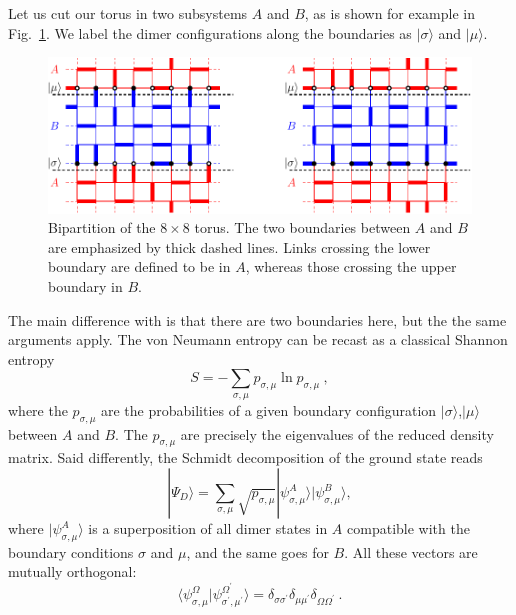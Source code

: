 \documentclass[11pt]{iopart}
\newcommand{\psm}{p_{\sigma,\mu}}
\begin{document}
Let us cut our torus in two subsystems $A$ and $B$, as is shown for example in Fig.~\ref{fig:bipartition}. We label the dimer configurations along the boundaries as $|\sigma\rangle$ and $|\mu\rangle$.
\begin{figure}[ht]
\begin{center}
\includegraphics[scale=0.8]{./figures/bipartition.pdf}
\end{center}
\caption{Bipartition of the $8\times 8$ torus. The two boundaries between $A$ and $B$ are emphasized by thick dashed lines. Links crossing the lower boundary are defined to be in $A$, whereas those crossing the upper boundary in $B$.}
\label{fig:bipartition}
\end{figure}
The main difference with \cite{Shannonee} is that there are two boundaries here, but the the same arguments apply. The von Neumann entropy can be recast as a classical Shannon entropy
\begin{equation}
 S=-\sum_{\sigma,\mu} p_{\sigma,\mu} \ln p_{\sigma,\mu}\ ,
\end{equation}
where the $p_{\sigma,\mu}$ are the probabilities of a given boundary configuration $|\sigma\rangle$,$|\mu\rangle$ between $A$ and $B$. 
\label{sec:lg.}
The $\psm$ are precisely the eigenvalues of the reduced density matrix. Said differently, the Schmidt decomposition of the ground state reads
\begin{equation}\label{eq:schmidt}
|\Psi_D\rangle=\sum_{
\sigma,\mu} \sqrt{p_{\sigma,\mu}}|\psi_{\sigma,\mu}^A\rangle |\psi_{\sigma,\mu}^B\rangle,
\end{equation}
where $|\psi_{\sigma,\mu}^A\rangle$ is a superposition of all dimer states in $A$ compatible with the boundary conditions $\sigma$ and $\mu$, and the same goes for $B$. All these vectors are mutually orthogonal:
\begin{equation}\label{eq:schmidt_orthogonality}
\langle \psi_{\sigma,\mu}^\Omega|\psi_{\sigma^\prime,\mu^\prime}^{\Omega^\prime}\rangle=\delta_{\sigma \sigma^\prime}\delta_{\mu \mu^\prime}\delta_{\Omega \Omega^\prime}\ .
\end{equation}
\end{document}
